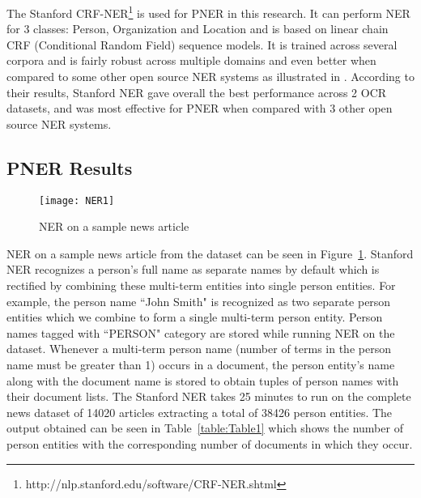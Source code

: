 The Stanford CRF-NER\footnote{http://nlp.stanford.edu/software/CRF-NER.shtml} is used for PNER in this research. It can perform NER for 3 classes: Person, Organization and Location and is based on linear chain CRF (Conditional Random Field) sequence models. It is trained across several corpora and is fairly robust across multiple domains and even better when compared to some other open source NER systems as illustrated in \cite{rodriquez2012comparison}. According to their results, Stanford NER gave overall the best performance across 2 OCR datasets, and was most effective for PNER when compared with 3 other open source NER systems.


\subsection{PNER Results}
\label{ner:results}
\begin{figure}[h]
  \centering
\texttt{[image: NER1]}
\caption{NER on a sample news article}
\label{figure:sample}
\end{figure} 




NER on a sample news article from the dataset can be seen in Figure~\ref{figure:sample}.
 Stanford NER recognizes a person's full name as separate names by default which is rectified by combining these multi-term entities into single person entities. For example, the person name ``John Smith" is recognized as two separate person entities which we combine to form a single multi-term person entity.
Person names tagged with ``PERSON" category are stored while running NER on the dataset.
Whenever a multi-term person name (number of terms in the person name must be greater than 1) occurs in a document, the person entity's name along with the document name is stored to obtain tuples of person names with their document lists.
The Stanford NER takes 25 minutes to run on the complete news dataset of 14020 articles extracting a total of 38426 person entities. The output obtained can be seen in Table~\ref{table:Table1} which shows the number of person entities with the corresponding number of documents in which they occur.  


